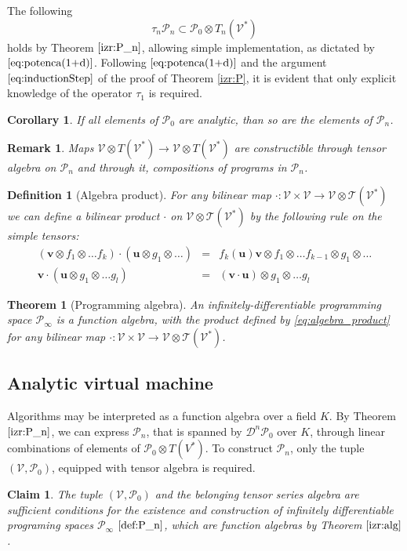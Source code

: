 \documentclass[preprint,12pt]{elsarticle}
\newcommand{\T}{\mathcal{T}}
\newcommand{\VV}{\mathcal{V}}
\newcommand{\uu}{\mathbf{u}}
\newcommand{\vv}{\mathbf{v}}
\newcommand{\dP}{\mathcal{P}}
\newcommand{\DD}{\mathcal{D}}
\newcommand{\sumd}{\tau}
\newtheorem{definicija}{Definition}[section]
\newtheorem{trditev}{Claim}[section]
\newtheorem{izrek}{Theorem}[section]
\newtheorem{opomba}{Remark}[section]
\newtheorem{corollary}{Corollary}[section]
\begin{document}
    The following
     \begin{equation}
     	\sumd_n\dP_n\subset\dP_0\otimes T_n(\VV^*)
     \end{equation}
   	holds by Theorem $\ref{izr:P_n}$, allowing simple implementation, as dictated by $\eqref{eq:potenca(1+d)}$. Following $\eqref{eq:potenca(1+d)}$ and the argument $\eqref{eq:inductionStep}$ of the proof of Theorem \ref{izr:P}, it is evident that only explicit knowledge of the operator $\sumd_1$ is required.
 \begin{corollary}\label{cor:analytic}
   If all elements of $\dP_0$ are analytic, than so are the elements of $\dP_n$.
   \end{corollary}        
        
       \begin{opomba}\label{rem:vTen}
       Maps $\VV\otimes T(\VV^*)\to \VV\otimes T(\VV^*)$ are constructible through tensor algebra on $\dP_n$ and through it, compositions of programs in $\dP_n$.
       \end{opomba}
       
 

\begin{definicija}[Algebra product]
 For any bilinear map $\cdot :\VV\times \VV\to \VV\otimes \T(\VV^*)$ we can define a
 bilinear product $\cdot$ on $\VV\otimes \T(\VV^*)$ by the following rule on the simple
 tensors:
 \begin{eqnarray}
   \label{eq:algebra_product}
   (\vv\otimes f_1\otimes\ldots f_k) \cdot (\uu\otimes g_1\otimes\ldots) &=& 
f_k(\uu)\vv\otimes f_1\otimes\ldots f_{k-1}\otimes g_1\otimes\ldots \\
   \vv\cdot (\uu\otimes g_1\otimes\ldots g_l) &=&  (\vv\cdot \uu)\otimes
    \nonumber                                              g_1\otimes\ldots g_l
 \end{eqnarray}
\end{definicija}
\begin{izrek}[Programming algebra]\label{izr:alg}
An infinitely-differentiable programming space $\dP_\infty$ is a function algebra,
with the product defined by \eqref{eq:algebra_product} for any bilinear map $\cdot :\VV\times \VV\to \VV\otimes \T(\VV^*)$.
\end{izrek}

\subsection{Analytic virtual machine}
Algorithms may be interpreted as a function algebra over a field $K$.
By Theorem $\ref{izr:P_n}$, we can express $\dP_n$, that is spanned by $\DD^n\dP_0$ over $K$, through linear combinations of elements of $\dP_0\otimes T(V^*)$. To construct $\dP_n$, only the tuple $(\VV,\dP_0)$, equipped with tensor algebra is required.
\begin{trditev}
The tuple  $(\VV,\dP_0)$ and the belonging \emph{tensor series algebra} are sufficient conditions for the existence and construction of \emph{infinitely differentiable programing spaces} $\dP_\infty$ $\eqref{def:P_n}$, which are \emph{function algebras} by Theorem $\ref{izr:alg}$.
\end{trditev}
\end{document}
